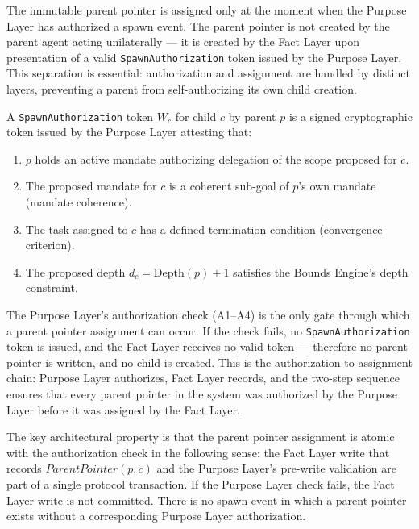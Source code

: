 The immutable parent pointer is assigned only at the moment when the Purpose Layer has authorized a spawn event. The parent pointer is not created by the parent agent acting unilaterally — it is created by the Fact Layer upon presentation of a valid \texttt{SpawnAuthorization} token issued by the Purpose Layer. This separation is essential: authorization and assignment are handled by distinct layers, preventing a parent from self-authorizing its own child creation.

\begin{dfn}
\label{dfn:spawn-authorization-token}
A \texttt{SpawnAuthorization} token $W_c$ for child $c$ by parent $p$ is a signed cryptographic token issued by the Purpose Layer attesting that:

\begin{enumerate}
    \item[(A1)] $p$ holds an active mandate authorizing delegation of the scope proposed for $c$.
    \item[(A2)] The proposed mandate for $c$ is a coherent sub-goal of $p$'s own mandate (mandate coherence).
    \item[(A3)] The task assigned to $c$ has a defined termination condition (convergence criterion).
    \item[(A4)] The proposed depth $d_c = \text{Depth}(p) + 1$ satisfies the Bounds Engine's depth constraint.
\end{enumerate}
\end{dfn}

The Purpose Layer's authorization check (A1–A4) is the only gate through which a parent pointer assignment can occur. If the check fails, no \texttt{SpawnAuthorization} token is issued, and the Fact Layer receives no valid token — therefore no parent pointer is written, and no child is created. This is the authorization-to-assignment chain: Purpose Layer authorizes, Fact Layer records, and the two-step sequence ensures that every parent pointer in the system was authorized by the Purpose Layer before it was assigned by the Fact Layer.

The key architectural property is that the parent pointer assignment is atomic with the authorization check in the following sense: the Fact Layer write that records $ParentPointer(p, c)$ and the Purpose Layer's pre-write validation are part of a single protocol transaction. If the Purpose Layer check fails, the Fact Layer write is not committed. There is no spawn event in which a parent pointer exists without a corresponding Purpose Layer authorization.

